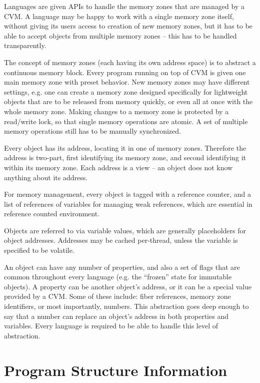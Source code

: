 Languages are given APIs to handle the memory zones that are managed by a CVM. A language may be happy to work with a single memory zone itself, without giving its users access to creation of new memory zones, but it has to be able to accept objects from multiple memory zones -- this has to be handled transparently. 

The concept of memory zones (each having its own address space) is to abstract a continuous memory block. Every program running on top of CVM is given one main memory zone with preset behavior. New memory zones may have different settings, e.g. one can create a memory zone designed specifically for lightweight objects that are to be released from memory quickly, or even all at once with the whole memory zone. Making changes to a memory zone is protected by a read/write lock, so that single memory operations are atomic. A set of multiple memory operations still has to be manually synchronized. 

Every object has its address, locating it in one of memory zones. Therefore the address is two-part, first identifying its memory zone, and second identifying it within its memory zone. Each address is a view -- an object does not know anything about its address. 

For memory management, every object is tagged with a reference counter, and a list of references of variables for managing weak references, which are essential in reference counted environment. 

Objects are referred to via variable values, which are generally placeholders for object addresses. Addresses may be cached per-thread, unless the variable is specified to be volatile. 

An object can have any number of properties, and also a set of flags that are common throughout every language (e.g. the ``frozen'' state for immutable objects). A property can be another object's address, or it can be a special value provided by a CVM. Some of these include: fiber references, memory zone identifiers, or most importantly, numbers. This abstraction goes deep enough to say that a number can replace an object's address in both properties and variables. Every language is required to be able to handle this level of abstraction. 






\section{Program Structure Information}

